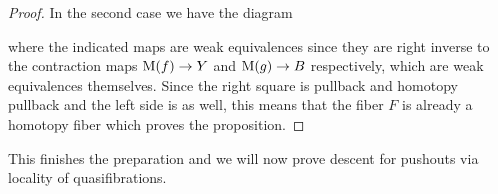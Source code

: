 \begin{lemma}
\begin{proof}
        In the second case we have the diagram
        \begin{center}
        \end{center}
        where the indicated maps are weak equivalences since they are right inverse to the contraction maps $\operatorname{M}(f)\to Y$ and $\operatorname{M}(g)\to B$ respectively, which are weak equivalences themselves.
        Since the right square is pullback and homotopy pullback and the left side is as well, this means that the fiber $F$ is already a homotopy fiber which proves the proposition.
    \end{proof}
\end{lemma}
This finishes the preparation and we will now prove descent for pushouts via locality of quasifibrations.
